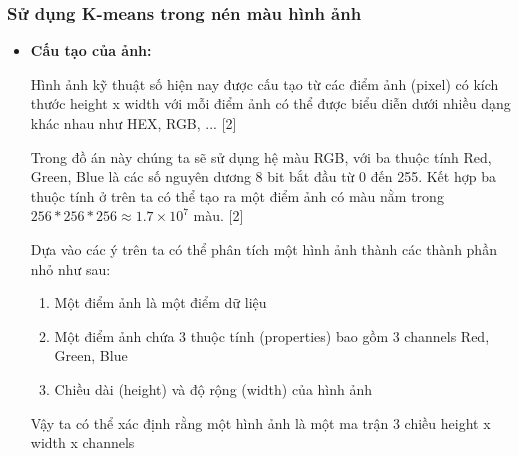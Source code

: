 \subsubsection{Sử dụng K-means trong nén màu hình ảnh}
\begin{itemize}
	\item \textbf{Cấu tạo của ảnh:}\par
	
	Hình ảnh kỹ thuật số hiện nay được cấu tạo từ các điểm ảnh (pixel) có kích thước height x width với mỗi điểm ảnh có thể được biểu diễn dưới nhiều dạng khác nhau như HEX, RGB, ... [2]
	
	Trong đồ án này chúng ta sẽ sử dụng hệ màu RGB, với ba thuộc tính Red, Green, Blue là các số nguyên dương 8 bit bắt đầu từ 0 đến 255. Kết hợp ba thuộc tính ở trên ta có thể tạo ra một điểm ảnh có màu nằm trong $256*256*256 \approx 1.7 \times 10^7$ màu. [2]
	
	Dựa vào các ý trên ta có thể phân tích một hình ảnh thành các thành phần nhỏ như sau:
	\begin{enumerate}
		\item Một điểm ảnh là một điểm dữ liệu
		\item Một điểm ảnh chứa 3 thuộc tính (properties) bao gồm 3 channels Red, Green, Blue
		\item Chiều dài (height) và độ rộng (width) của hình ảnh
	\end{enumerate}
	
	Vậy ta có thể xác định rằng một hình ảnh là một ma trận 3 chiều height x width x channels
	

\end{itemize}
